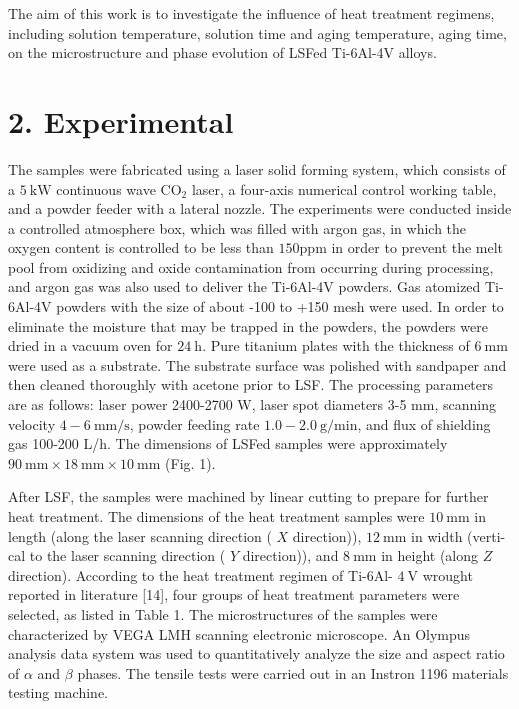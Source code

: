 \documentclass[10pt]{article}
\begin{document}
The aim of this work is to investigate the influence of heat treatment regimens, including solution temperature, solution time and aging temperature, aging time, on the microstructure and phase evolution of LSFed Ti-6Al-4V alloys.

\section*{2. Experimental}
The samples were fabricated using a laser solid forming system, which consists of a $5 \mathrm{~kW}$ continuous wave $\mathrm{CO}_{2}$ laser, a four-axis numerical control working table, and a powder feeder with a lateral nozzle. The experiments were conducted inside a controlled atmosphere box, which was filled with argon gas, in which the oxygen content is controlled to be less than $150 \mathrm{ppm}$ in order to prevent the melt pool from oxidizing and oxide contamination from occurring during processing, and argon gas was also used to deliver the Ti-6Al-4V powders. Gas atomized Ti-6Al-4V powders with the size of about -100 to +150 mesh were used. In order to eliminate the moisture that may be trapped in the powders, the powders were dried in a vacuum oven for $24 \mathrm{~h}$. Pure titanium plates with the thickness of $6 \mathrm{~mm}$ were used as a substrate. The substrate surface was polished with sandpaper and then cleaned thoroughly with acetone prior to LSF. The processing parameters are as follows: laser power 2400-2700 W, laser spot diameters 3-5 mm, scanning velocity $4-6 \mathrm{~mm} / \mathrm{s}$, powder feeding rate $1.0-2.0 \mathrm{~g} / \mathrm{min}$, and flux of shielding gas 100-200 L/h. The dimensions of LSFed samples were approximately $90 \mathrm{~mm} \times 18 \mathrm{~mm} \times 10 \mathrm{~mm}$ (Fig. 1).

After LSF, the samples were machined by linear cutting to prepare for further heat treatment. The dimensions of the heat treatment samples were $10 \mathrm{~mm}$ in length (along the laser scanning direction ( $X$ direction)), $12 \mathrm{~mm}$ in width (verti- cal to the laser scanning direction ( $Y$ direction)), and $8 \mathrm{~mm}$ in height (along $Z$ direction). According to the heat treatment regimen of Ti-6Al- $4 \mathrm{~V}$ wrought reported in literature [14], four groups of heat treatment parameters were selected, as listed in Table 1. The microstructures of the samples were characterized by VEGA LMH scanning electronic microscope. An Olympus analysis data system was used to quantitatively analyze the size and aspect ratio of $\alpha$ and $\beta$ phases. The tensile tests were carried out in an Instron 1196 materials testing machine.
\end{document}
